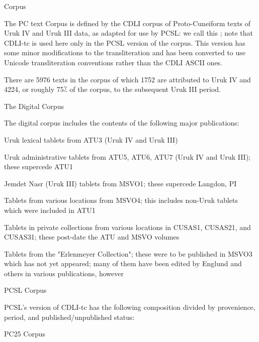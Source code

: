 \Henddl
\Hh{}Corpus


\par The PC text Corpus is defined by the CDLI corpus of
      Proto-Cuneiform texts of Uruk IV and Uruk III data, as adapted
      for use by PCSL: we call this ; note that
      CDLI-tc is used here only in the PCSL version of the
      corpus. This version has some minor modifications to the
      transliteration and has been converted to use Unicode
      transliteration conventions rather than the CDLI ASCII ones.


\par There are 5976 texts in the corpus of which 1752 are
      attributed to Uruk IV and 4224, or roughly 75⁒ of the corpus, to
      the subsequent Uruk III period.

\Hhhh{}The Digital Corpus


\par The digital corpus includes the contents of the following major publications:

\Hul\Hli{}Uruk lexical tablets from ATU3 (Uruk IV and Uruk III)

\Hli{}Uruk administrative tablets from ATU5, ATU6, ATU7 (Uruk IV and Uruk III);
	these supercede ATU1

\Hli{}Jemdet Nasr (Uruk III) tablets from MSVO1; these supercede
	Langdon, PI

\Hli{}Tablets from various locations from MSVO4; this includes
	non-Uruk tablets which were included in ATU1

\Hli{}Tablets in private collections from various locations in
	CUSAS1, CUSAS21, and CUSAS31; these post-date the ATU and MSVO
	volumes

\Hli{}Tablets from the "Erlenmeyer Collection"; these were to be
	published in MSVO3 which has not yet appeared; many of them
	have been edited by Englund and others in various
	publications, however

\Hendul
\Hhhh{}PCSL Corpus


\par PCSL's version of CDLI-tc has the following composition
      divided by provenience, period, and published/unpublished
      status:

\bigskip
{}
\Hhhh{}PC25 Corpus


